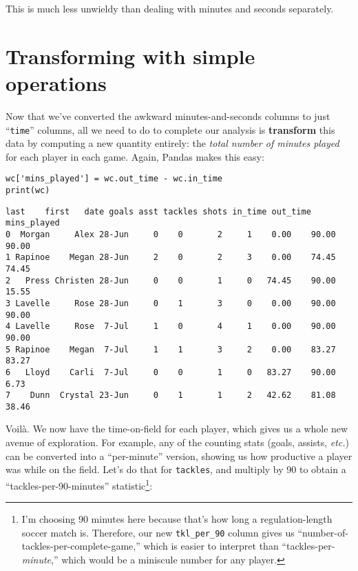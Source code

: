 This is much less unwieldy than dealing with minutes and seconds separately.


\section{Transforming with simple operations}



Now that we've converted the awkward minutes-and-seconds columns to just
``\texttt{time}'' columns, all we need to do to complete our analysis is
\textbf{transform} this data by computing a new quantity entirely: the
\textit{total number of minutes played} for each player in each game. Again,
Pandas makes this easy:

\begin{Verbatim}[fontsize=\small,samepage=true,frame=single,framesep=3mm]
wc['mins_played'] = wc.out_time - wc.in_time
print(wc)
\end{Verbatim}
\vspace{-.2in}

\begin{Verbatim}[fontsize=\footnotesize,samepage=true,frame=leftline,framesep=5mm,framerule=1mm]
     last    first   date goals asst tackles shots in_time out_time mins_played
0  Morgan     Alex 28-Jun     0    0       2     1    0.00    90.00       90.00
1 Rapinoe    Megan 28-Jun     2    0       2     3    0.00    74.45       74.45
2   Press Christen 28-Jun     0    0       1     0   74.45    90.00       15.55
3 Lavelle     Rose 28-Jun     0    1       3     0    0.00    90.00       90.00
4 Lavelle     Rose  7-Jul     1    0       4     1    0.00    90.00       90.00
5 Rapinoe    Megan  7-Jul     1    1       3     2    0.00    83.27       83.27
6   Lloyd    Carli  7-Jul     0    0       1     0   83.27    90.00        6.73
7    Dunn  Crystal 23-Jun     0    1       1     2   42.62    81.08       38.46
\end{Verbatim}


Voil\`{a}. We now have the time-on-field for each player, which gives us a
whole new avenue of exploration. For example, any of the counting stats (goals,
assists, \textit{etc.}) can be converted into a ``per-minute'' version, showing
us how productive a player was while on the field. Let's do that for
\texttt{tackles}, and multiply by 90 to obtain a ``tackles-per-90-minutes''
statistic\footnote{I'm choosing 90 minutes here because that's how long a
regulation-length soccer match is. Therefore, our new \texttt{tkl\_per\_90}
column gives us ``number-of-tackles-per-complete-game,'' which is easier to
interpret than ``tackles-per-\textit{minute},'' which would be a miniscule
number for any player.}:


